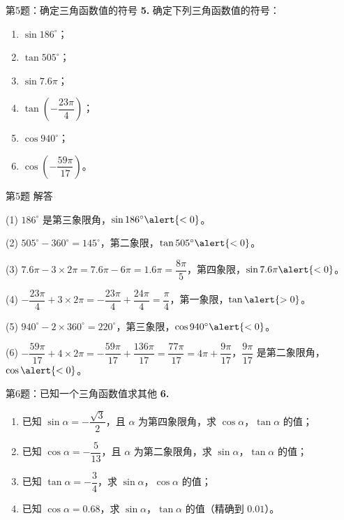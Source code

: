 \documentclass[10pt,aspectratio=169,serif]{beamer}
\begin{document}
\begin{frame}[t]{第5题：确定三角函数值的符号}
\textbf{5.} 确定下列三角函数值的符号：
\begin{enumerate}
  \item $\sin 186^\circ$；
  \item $\tan 505^\circ$；
  \item $\sin 7.6\pi$；
  \item $\tan\left(-\dfrac{23\pi}{4}\right)$；
  \item $\cos 940^\circ$；
  \item $\cos\left(-\dfrac{59\pi}{17}\right)$。
\end{enumerate}
\end{frame}

\begin{frame}[t]{第5题 解答}
\begin{tcolorbox}[colback=orange!10,colframe=orange,title=\textbf{解}]
\small
(1) $186^\circ$ 是第三象限角，$\sin 186^\circ\alert{<0}$。

(2) $505^\circ-360^\circ=145^\circ$，第二象限，$\tan 505^\circ\alert{<0}$。

(3) $7.6\pi-3\times 2\pi=7.6\pi-6\pi=1.6\pi=\dfrac{8\pi}{5}$，第四象限，$\sin 7.6\pi\alert{<0}$。

(4) $-\dfrac{23\pi}{4}+3\times 2\pi=-\dfrac{23\pi}{4}+\dfrac{24\pi}{4}=\dfrac{\pi}{4}$，第一象限，$\tan\alert{>0}$。

(5) $940^\circ-2\times 360^\circ=220^\circ$，第三象限，$\cos 940^\circ\alert{<0}$。

(6) $-\dfrac{59\pi}{17}+4\times 2\pi=-\dfrac{59\pi}{17}+\dfrac{136\pi}{17}=\dfrac{77\pi}{17}=4\pi+\dfrac{9\pi}{17}$，$\dfrac{9\pi}{17}$ 是第二象限角，$\cos\alert{<0}$。
\end{tcolorbox}
\end{frame}

\begin{frame}[t]{第6题：已知一个三角函数值求其他}
\textbf{6.}
\begin{enumerate}
  \item 已知 $\sin\alpha=-\dfrac{\sqrt{3}}{2}$，且 $\alpha$ 为第四象限角，求 $\cos\alpha$，$\tan\alpha$ 的值；
  \item 已知 $\cos\alpha=-\dfrac{5}{13}$，且 $\alpha$ 为第二象限角，求 $\sin\alpha$，$\tan\alpha$ 的值；
  \item 已知 $\tan\alpha=-\dfrac{3}{4}$，求 $\sin\alpha$，$\cos\alpha$ 的值；
  \item 已知 $\cos\alpha=0.68$，求 $\sin\alpha$，$\tan\alpha$ 的值（精确到 $0.01$）。
\end{enumerate}
\end{frame}
\end{document}
